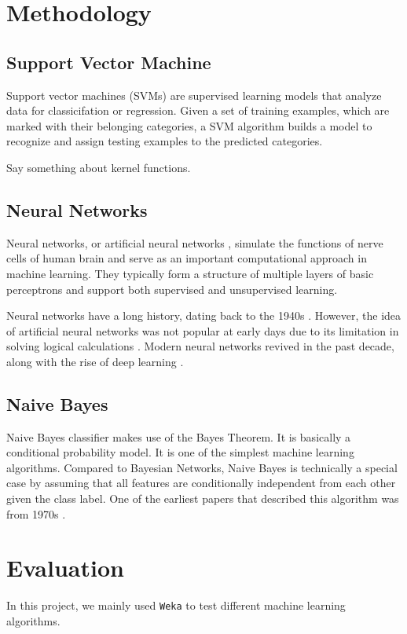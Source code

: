 \documentclass[11pt]{article}
\begin{document}
\section{Methodology}\label{sec:metho}

\subsection{Support Vector Machine}
Support vector machines (SVMs) \cite{cortes1995support} are supervised learning models that analyze data for classicifation or regression. Given a set of training examples, which are marked with their belonging categories, a SVM algorithm builds a model to recognize and assign testing examples to the predicted categories. 

Say something about kernel functions.

\subsection{Neural Networks}
Neural networks, or artificial neural networks \cite{hagan1996neural}, simulate the functions of nerve cells of human brain and serve as an important computational approach in machine learning. They typically form a structure of multiple layers of basic perceptrons and support both supervised and unsupervised learning.

Neural networks have a long history, dating back to the 1940s \cite{mcculloch1943logical}. However, the idea of artificial neural networks was not popular at early days due to its limitation in solving logical calculations \cite{minsky1988perceptrons}. Modern neural networks revived in the past decade, along with the rise of deep learning \cite{bengio2009learning, schmidhuber2015deep}.

\subsection{Naive Bayes}
Naive Bayes classifier makes use of the Bayes Theorem. It is basically a conditional probability model. It is one of the simplest machine learning algorithms. Compared to Bayesian Networks, Naive Bayes is technically a special case by assuming that all features are conditionally independent from each other given the class label. One of the earliest papers that described this algorithm was from 1970s \cite{duda1973pattern}. 

\section{Evaluation}
In this project, we mainly used \texttt{Weka} \cite{hall2009weka} to test different machine learning algorithms.
\end{document}
